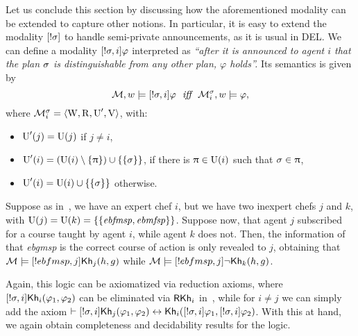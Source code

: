 \medskip 

Let us conclude this section by discussing how the aforementioned modality can be extended to capture other notions. In particular, it is easy to extend the modality $[!\sigma]$ to handle semi-private announcements, as it is usual in DEL. We can define a modality  $[!\sigma,i]\varphi$ interpreted as \emph{``after it is announced to agent $i$ that the plan $\sigma$ is distinguishable from any other plan, $\varphi$ holds''.} Its semantics is given by 
\[
    \modults,w \models \srefbox{\plan,i}\varphi \ \ \iff \ \ \modults^\plan_i,w \models \varphi,
\]
where $\mathcal{M}^\sigma_i = \langle \operatorname{W},\operatorname{R},\operatorname{U}',\operatorname{V} \rangle$, with:
\begin{itemize}
\item $\operatorname{U}'(j) = \operatorname{U}(j)$ if $j \neq i$,
\item $\operatorname{U}'(i) = (\operatorname{U}(i) \setminus \{ \uppi \}) \cup \{ \{ \sigma \} \}$, if there is $\uppi \in \operatorname{U}(i)$ such that $\sigma \in \uppi$,
\item $\operatorname{U}'(i) = \operatorname{U}(i) \cup \{ \{ \sigma \} \}$ otherwise.
\end{itemize}   

\medskip 

\begin{example}
Suppose as in~, we have an expert chef $i$, but we have two inexpert chefs $j$ and $k$, with $\operatorname{U}(j)=\operatorname{U}(k)=\{ \{ \mathit{ebfmsp},\mathit{ebmfsp} \} \}$. Suppose now, that agent $j$ subscribed for a course taught by agent $i$, while agent $k$ does not. Then, the information of that \textit{ebgmsp} is the correct course of action is only revealed to $j$, obtaining that $\mathcal{M}\models[!ebfmsp,j]{\sf Kh}_j(h,g)$ while $\mathcal{M}\models[!ebfmsp,j]\neg{\sf Kh}_k(h,g)$.
\end{example}

\medskip 

Again, this logic can be axiomatized via reduction axioms, where $[!\sigma,i]{\sf Kh}_i(\varphi_1,\varphi_2)$ can be eliminated via $\textsf{RKh}_i$ in~, while for $i\neq j$ we can simply add the axiom $\vdash [!\sigma,i] {\sf Kh}_j(\varphi_1,\varphi_2) \leftrightarrow {\sf Kh}_i([!\sigma,i] \varphi_1,[!\sigma,i] \varphi_2)$. With this at hand, we again obtain completeness and decidability results for the logic.
